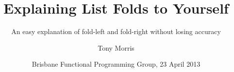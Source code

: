 \documentclass{beamer}
\author{
  {\small Tony Morris\\}
}
\begin{document}
\title{\large Explaining List Folds to Yourself}
\subtitle{\tiny{An easy explanation of fold-left and fold-right without losing accuracy}}

\date{{\footnotesize Brisbane Functional Programming Group, 23 April 2013}}

\begin{frame}
  \titlepage
\end{frame}


\end{document}
